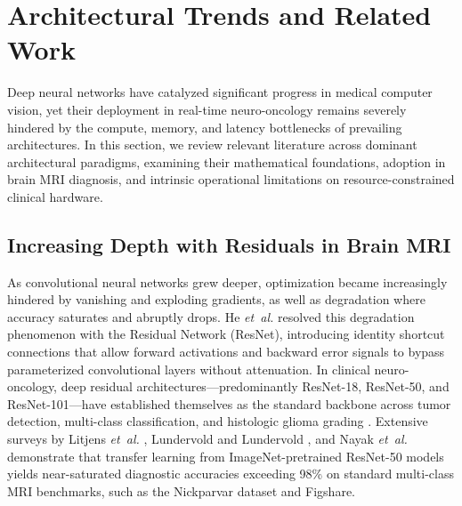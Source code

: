\section{Architectural Trends and Related Work}

Deep neural networks have catalyzed significant progress in medical computer vision, yet their deployment in real-time neuro-oncology remains severely hindered by the compute, memory, and latency bottlenecks of prevailing architectures. In this section, we review relevant literature across dominant architectural paradigms, examining their mathematical foundations, adoption in brain MRI diagnosis, and intrinsic operational limitations on resource-constrained clinical hardware.

\subsection{Increasing Depth with Residuals in Brain MRI}
As convolutional neural networks grew deeper, optimization became increasingly hindered by vanishing and exploding gradients, as well as degradation where accuracy saturates and abruptly drops. He \emph{et~al.} \cite{14} resolved this degradation phenomenon with the Residual Network (ResNet), introducing identity shortcut connections that allow forward activations and backward error signals to bypass parameterized convolutional layers without attenuation. In clinical neuro-oncology, deep residual architectures---predominantly ResNet-18, ResNet-50, and ResNet-101---have established themselves as the standard backbone across tumor detection, multi-class classification, and histologic glioma grading \cite{10, 38, 54, 55}. Extensive surveys by Litjens \emph{et~al.} \cite{10}, Lundervold and Lundervold \cite{54}, and Nayak \emph{et~al.} \cite{55} demonstrate that transfer learning from ImageNet-pretrained ResNet-50 models yields near-saturated diagnostic accuracies exceeding 98\% on standard multi-class MRI benchmarks, such as the Nickparvar dataset \cite{34} and Figshare.

